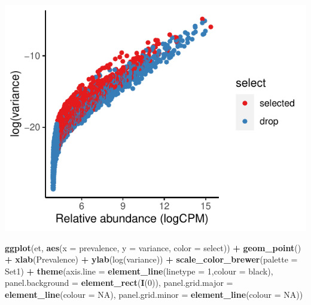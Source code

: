 \documentclass[
]{article}
\newenvironment{Shaded}{\begin{snugshade}}{\end{snugshade}}
\newcommand{\AttributeTok}[1]{\textcolor[rgb]{0.13,0.29,0.53}{#1}}
\newcommand{\ConstantTok}[1]{\textcolor[rgb]{0.56,0.35,0.01}{#1}}
\newcommand{\DecValTok}[1]{\textcolor[rgb]{0.00,0.00,0.81}{#1}}
\newcommand{\FunctionTok}[1]{\textcolor[rgb]{0.13,0.29,0.53}{\textbf{#1}}}
\newcommand{\NormalTok}[1]{#1}
\newcommand{\SpecialCharTok}[1]{\textcolor[rgb]{0.81,0.36,0.00}{\textbf{#1}}}
\newcommand{\StringTok}[1]{\textcolor[rgb]{0.31,0.60,0.02}{#1}}
\begin{document}
\includegraphics{workshop_files/figure-latex/unnamed-chunk-52-5.pdf}

\begin{Shaded}
\begin{Highlighting}[]

\FunctionTok{ggplot}\NormalTok{(et, }\FunctionTok{aes}\NormalTok{(}\AttributeTok{x =}\NormalTok{ prevalence, }\AttributeTok{y =}\NormalTok{ variance, }\AttributeTok{color =}\NormalTok{ select)) }\SpecialCharTok{+} \FunctionTok{geom\_point}\NormalTok{() }\SpecialCharTok{+}
  \FunctionTok{xlab}\NormalTok{(}\StringTok{\textquotesingle{}Prevalence\textquotesingle{}}\NormalTok{) }\SpecialCharTok{+} \FunctionTok{ylab}\NormalTok{(}\StringTok{\textquotesingle{}log(variance)\textquotesingle{}}\NormalTok{) }\SpecialCharTok{+}
  \FunctionTok{scale\_color\_brewer}\NormalTok{(}\AttributeTok{palette =} \StringTok{\textquotesingle{}Set1\textquotesingle{}}\NormalTok{) }\SpecialCharTok{+}
  \FunctionTok{theme}\NormalTok{(}\AttributeTok{axis.line =} \FunctionTok{element\_line}\NormalTok{(}\AttributeTok{linetype =} \DecValTok{1}\NormalTok{,}\AttributeTok{colour =} \StringTok{\textquotesingle{}black\textquotesingle{}}\NormalTok{),}
        \AttributeTok{panel.background =} \FunctionTok{element\_rect}\NormalTok{(}\FunctionTok{I}\NormalTok{(}\DecValTok{0}\NormalTok{)),}
        \AttributeTok{panel.grid.major =} \FunctionTok{element\_line}\NormalTok{(}\AttributeTok{colour =} \ConstantTok{NA}\NormalTok{),}
        \AttributeTok{panel.grid.minor =} \FunctionTok{element\_line}\NormalTok{(}\AttributeTok{colour =} \ConstantTok{NA}\NormalTok{))}
\end{Highlighting}
\end{Shaded}
\end{document}
